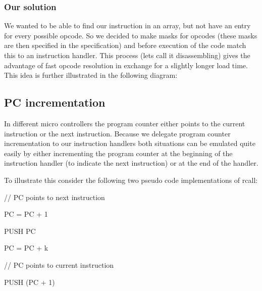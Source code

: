 \documentclass[a4paper]{article}
\begin{document}
\subsubsection{Our solution}
{\sffamily
We wanted to be able to find our instruction in an array, but not have
an entry for every possible opcode. So we decided to make masks for
opcodes (these masks are then specified in the specification) and
before execution of the code match this to an instruction handler. This
process (lets call it disassembling) gives the advantage of fast opcode
resolution in exchange for a slightly longer load time. This idea is
further illustrated in the following diagram:}

\bigskip

\subsection{}
\clearpage\subsection[PC incrementation]{PC incrementation}
{\sffamily
In different micro controllers the program counter either points to the
current instruction or the next instruction. Because we delegate
program counter incrementation to our instruction handlers both
situations can be emulated quite easily by either incrementing the
program counter at the beginning of the instruction handler (to
indicate the next instruction) or at the end of the handler.}

{\sffamily
To illustrate this consider the following two pseudo code
implementations of rcall:}

{\ttfamily
// PC points to next instruction}


\bigskip

{\ttfamily
PC = PC + 1}


\bigskip

{\ttfamily
PUSH PC}


\bigskip

{\ttfamily
PC = PC + k}


\bigskip

{\ttfamily
// PC points to current instruction}


\bigskip

{\ttfamily
PUSH (PC + 1)}
\end{document}
